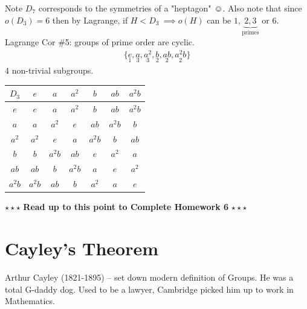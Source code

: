 \begin{enumerate}
    Note $D_7$ corresponds to the symmetries of a "heptagon" $\smiley{}$. Also note that since $o(D_3)=6$ then by Lagrange, if $H < D_3 \ \implies o(H)$ can be $1,\underbrace{2,3}_{\text{primes}}$ or $6$. \steezybreak\\
    Lagrange Cor \#5: groups of prime order are cyclic. \\
    \begin{align}
        \{\underset{1}{e},\underset{3}{a},\underset{3}{a^2},\underset{2}{b},\underset{2}{ab},\underset{2}{a^2 b}\} \nonumber
    \end{align}
    $4$ non-trivial subgroups. \\
    \begin{tabular}{c|cccccc} 
            $D_3$ & $e$ & $a$ & $a^2$& $b$ & $ab$ & $a^2 b$   \\ \hline 
            $e$ & $e$ & $a$ & $a^2$& $b$ & $ab$ & $a^2 b$   \\  
            $a$ & $a$ & $a^2$ & $e$& $ab$ & $a^2 b$ & $b$   \\ 
            $a^2$ & $a^2$ & $e$ & $a$& $a^2 b$ & $b$ & $ab$   \\  
            $b$ & $b$ & $a^2 b$ & $ab$& $e$ & $a^2$ & $a$   \\  
            $ab$ & $ab$ & $b$ & $a^2b$& $a$ & $e$ & $a^2$   \\  
            $a^2 b$ & $a^2 b$ & $ab$ & $b$& $a^2$ & $a$ & $e$   \\  
    \end{tabular}
\end{enumerate}
\steezybreak
\begin{tcolorbox}
    \begin{center}
        $\star\star\star$ \textbf{Read up to this point to Complete Homework 6} $\star\star\star$
    \end{center}
    \end{tcolorbox}
\steezybreak
\section{Cayley's Theorem}
Arthur Cayley (1821-1895) -- set down modern definition of Groups. He was a total G-daddy dog. Used to be a lawyer, Cambridge picked him up to work in Mathematics.


